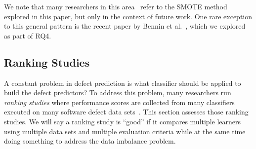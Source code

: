 \documentclass[sigconf]{acmart}
\theoremstyle{break}
\newcommand{\sma}{{\sc SMOTE}}
\newcommand{\smb}{{\sc SMOTUNED}}
\begin{document}
We note that  
many researchers in this area~\cite{gray2009using,yu2017performance,wang2013using} refer to the {\sma} method explored in this paper,  but only in the context of future work.
 One rare exception to this general pattern is the recent paper by   Bennin et al.~\cite{bennin2017mahakil}, which we explored as part of
RQ4.

 



 
 \subsection{Ranking Studies}
\label{sect:rank}

A constant problem in defect prediction is what  classifier should be applied to  build  the  defect  predictors?
To address this problem, many researchers run {\em ranking studies} where  performance scores 
are collected from  many classifiers  executed on  many software defect data sets~\cite{lessmann2008benchmarking,hall2012systematic,elish2008predicting,menzies2010defect,gondra2008applying,radjenovic2013software,jiang2008techniques,wang2013using,mende2009revisiting,li2012sample,khoshgoftaar2010attribute,jiang2009variance,ghotra2015revisiting,jiang2008can,tantithamthavorn2016automated,fu2016tuning}.
This section assesses those ranking studies. We will say a ranking study is ``good'' if it compares multiple learners using multiple data sets and multiple evaluation criteria
while at the same time doing something to address the data imbalance problem.
\end{document}
